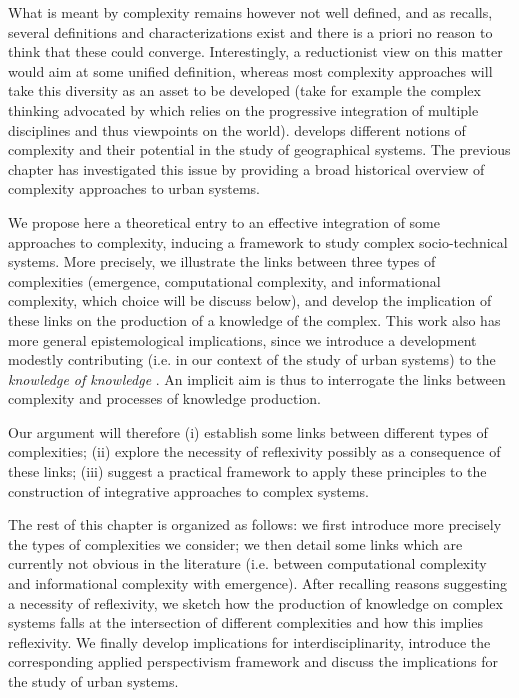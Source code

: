 What is meant by complexity remains however not well defined, and as \cite{chu2008criteria} recalls, several definitions and characterizations exist and there is a priori no reason to think that these could converge. Interestingly, a reductionist view on this matter would aim at some unified definition, whereas most complexity approaches will take this diversity as an asset to be developed (take for example the complex thinking advocated by \cite{morin1991methode} which relies on the progressive integration of multiple disciplines and thus viewpoints on the world). \cite{manson2001simplifying} develops different notions of complexity and their potential in the study of geographical systems. The previous chapter \cite{batty2018which} has investigated this issue by providing a broad historical overview of complexity approaches to urban systems. 


We propose here a theoretical entry to an effective integration of some approaches to complexity, inducing a framework to study complex socio-technical systems. More precisely, we illustrate the links between three types of complexities (emergence, computational complexity, and informational complexity, which choice will be discuss below), and develop the implication of these links on the production of a knowledge of the complex. This work also has more general epistemological implications, since we introduce a development modestly contributing (i.e. in our context of the study of urban systems) to the \emph{knowledge of knowledge} \cite{edgar1986methode}. An implicit aim is thus to interrogate the links between complexity and processes of knowledge production.


Our argument will therefore (i) establish some links between different types of complexities; (ii) explore the necessity of reflexivity possibly as a consequence of these links; (iii) suggest a practical framework to apply these principles to the construction of integrative approaches to complex systems. 

The rest of this chapter is organized as follows: we first introduce more precisely the types of complexities we consider; we then detail some links which are currently not obvious in the literature (i.e. between computational complexity and informational complexity with emergence). After recalling reasons suggesting a necessity of reflexivity, we sketch how the production of knowledge on complex systems falls at the intersection of different complexities and how this implies reflexivity. We finally develop implications for interdisciplinarity, introduce the corresponding applied perspectivism framework and discuss the implications for the study of urban systems.



